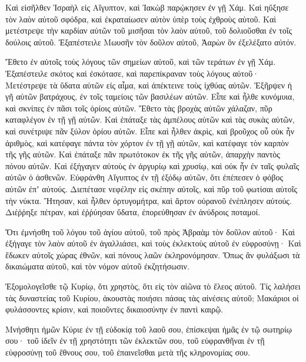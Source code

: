 \begin{spacing}{1.1}
\begin{multicols}{2}
Καὶ εἰσῆλθεν Ἰσραὴλ εἰς Αἴγυπτον, καὶ Ἰακὼβ παρῴκησεν ἐν γῇ Χάμ.
Καὶ ηὔξησε τὸν λαὸν αὐτοῦ σφόδρα, καὶ ἐκραταίωσεν αὐτὸν ὑπὲρ τοὺς ἐχθροὺς αὐτοῦ.
Καὶ μετέστρεψε τὴν καρδίαν αὐτῶν τοῦ μισῆσαι τὸν λαὸν αὐτοῦ, τοῦ δολιοῦσθαι ἐν τοῖς δούλοις αὐτοῦ.
Ἐξαπέστειλε Μωυσῆν τὸν δοῦλον αὐτοῦ, Ἀαρὼν ὃν ἐξελέξατο αὐτόν.

Ἔθετο ἐν αὐτοῖς τοὺς λόγους τῶν σημείων αὐτοῦ, καὶ τῶν τεράτων ἐν γῇ Χάμ.
Ἐξαπέστειλε σκότος καὶ ἐσκότασε, καὶ παρεπίκραναν τοὺς λόγους αὐτοῦ·
Μετέστρεψε τὰ ὕδατα αὐτῶν εἰς αἷμα, καὶ ἀπέκτεινε τοὺς ἰχθύας αὐτῶν.
Ἐξῆρψεν ἡ γῆ αὐτῶν βατράχους, ἐν τοῖς ταμείοις τῶν βασιλέων αὐτῶν.
Εἶπε καὶ ἦλθε κυνόμυια, καὶ σκνίπες ἐν πᾶσι τοῖς ὁρίοις αὐτῶν.
Ἔθετο τὰς βροχὰς αὐτῶν χάλαζαν, πῦρ καταφλέγον ἐν τῇ γῇ αὐτῶν.
Καὶ ἐπάταξε τὰς ἀμπέλους αὐτῶν καὶ τὰς συκὰς αὐτῶν, καὶ συνέτριψε πᾶν ξύλον ὁρίου αὐτῶν.
Εἶπε καὶ ἦλθεν ἀκρὶς, καὶ βροῦχος οὗ οὐκ ἦν ἀριθμὸς,
καὶ κατέφαγε πάντα τὸν χόρτον ἐν τῇ γῇ αὐτῶν, καὶ κατέφαγε τὸν καρπὸν τῆς γῆς αὐτῶν.
Καὶ ἐπάταξε πᾶν πρωτότοκον ἐκ τῆς γῆς αὐτῶν, ἀπαρχὴν παντὸς πόνου αὐτῶν.
Καὶ ἐξήγαγεν αὐτοὺς ἐν ἀργυρίῳ καὶ χρυσίῳ, καὶ οὐκ ἦν ἐν ταῖς φυλαῖς αὐτῶν ὁ ἀσθενῶν.
Εὐφράνθη Αἴγυπτος ἐν τῇ ἐξόδῳ αὐτῶν, ὅτι ἐπέπεσεν ὁ φόβος αὐτῶν ἐπʼ αὐτούς.
Διεπέτασε νεφέλην εἰς σκέπην αὐτοῖς, καὶ πῦρ τοῦ φωτίσαι αὐτοῖς τὴν νύκτα.
Ἤτησαν, καὶ ἦλθεν ὀρτυγομήτρα, καὶ ἄρτον οὐρανοῦ ἐνέπλησεν αὐτούς.
Διέῤῥηξε πέτραν, καὶ ἐῤῥύησαν ὕδατα, ἐπορεύθησαν ἐν ἀνύδροις ποταμοί.

Ὅτι ἐμνήσθη τοῦ λόγου τοῦ ἁγίου αὐτοῦ, τοῦ πρὸς Ἀβραὰμ τὸν δοῦλον αὐτοῦ·
Καὶ ἐξήγαγε τὸν λαὸν αὐτοῦ ἐν ἀγαλλιάσει, καὶ τοὺς ἐκλεκτοὺς αὐτοῦ ἐν εὐφροσύνῃ·
Καὶ ἔδωκεν αὐτοῖς χώρας ἐθνῶν, καὶ πόνους λαῶν ἐκληρονόμησαν.
Ὅπως ἂν φυλάξωσι τὰ δικαιώματα αὐτοῦ, καὶ τὸν νόμον αὐτοῦ ἐκζητήσωσιν.

Ἐξομολογεῖσθε τῷ Κυρίῳ, ὅτι χρηστὸς, ὅτι εἰς τὸν αἰῶνα τὸ ἔλεος αὐτοῦ.
Τίς λαλήσει τὰς δυναστείας τοῦ Κυρίου, ἀκουστὰς ποιήσει πάσας τὰς αἰνέσεις αὐτοῦ;
Μακάριοι οἱ φυλάσσοντες κρίσιν, καὶ ποιοῦντες δικαιοσύνην ἐν παντὶ καιρῷ.

Μνήσθητι ἡμῶν Κύριε ἐν τῇ εὐδοκίᾳ τοῦ λαοῦ σου, ἐπίσκεψαι ἡμᾶς ἐν τῷ σωτηρίῳ σου·
τοῦ ἰδεῖν ἐν τῇ χρηστότητι τῶν ἐκλεκτῶν σου, τοῦ εὐφρανθῆναι ἐν τῇ εὐφροσύνῃ τοῦ ἔθνους σου, τοῦ ἐπαινεῖσθαι μετὰ τῆς κληρονομίας σου.


\end{multicols}
\end{spacing}
